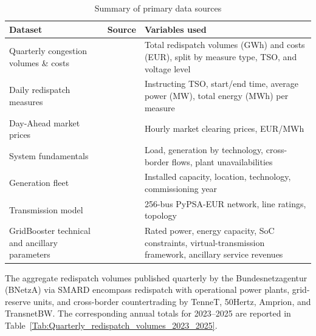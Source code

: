 \begin{table}[htbp]
\centering
\caption{Summary of primary data sources}
\label{Tab:Data_Overview_GridBooster}
\small
\begin{tabular}{p{3.5cm} p{3.8cm} p{6.5cm}}
\toprule
\textbf{Dataset} & \textbf{Source} & \textbf{Variables used} \\
\midrule
Quarterly congestion volumes \& costs & \citet{SMARD_Q2_2024, SMARD_Q3_2024, SMARD_Q2_2025} & Total redispatch volumes (GWh) and costs (EUR), split by measure type, TSO, and voltage level \\
Daily redispatch measures & \citet{Netztransparenz_Daily_Redispatch_Data_2024} & Instructing TSO, start/end time, average power (MW), total energy (MWh) per measure \\
Day-Ahead market prices & \citet{EPEX_2024_Power_Exchange_Data} & Hourly market clearing prices, EUR/MWh \\
System fundamentals & \citet{ENTSOE_2024_Transparency_Platform} & Load, generation by technology, cross-border flows, plant unavailabilities \\
Generation fleet & \citet{Bundesnetzagentur_2023_Kraftwerksliste, MaStR_2025_open_register} & Installed capacity, location, technology, commissioning year \\
Transmission model & \citet{Frysztacki_2020_Modeling_Curtailment_Germany, Frysztacki_2021_Network_Resolution_VRE, Brown_2018_PyPSA_Eur} & 256-bus PyPSA-EUR network, line ratings, topology \\
GridBooster technical and ancillary parameters & \citet{Fluence_Consentec_2022_GridBooster_Profitability_Assessment, Consentec_Fluence_2025_GridBooster_Monetary_Valuation, Fluence_2020_Virtual_Transmission_Whitepaper} & Rated power, energy capacity, SoC constraints, virtual-transmission framework, ancillary service revenues \\
\bottomrule
\end{tabular}
\end{table}



The aggregate redispatch volumes published quarterly by the Bundesnetzagentur (BNetzA) via SMARD encompass redispatch with operational power plants, grid-reserve units, and cross-border countertrading by TenneT, 50Hertz, Amprion, and TransnetBW. The corresponding annual totals for 2023--2025 are reported in Table~\ref{Tab:Quarterly_redispatch_volumes_2023_2025}.
 
